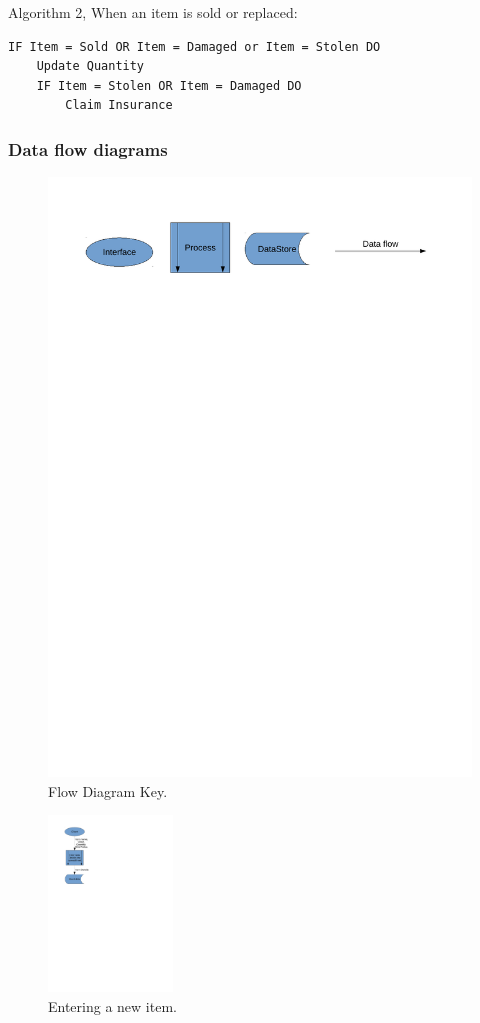 \documentclass[a4paper,12pt]{report}
\begin{document}
Algorithm 2, When an item is sold or replaced:
\begin{lstlisting}
IF Item = Sold OR Item = Damaged or Item = Stolen DO
    Update Quantity
    IF Item = Stolen OR Item = Damaged DO
        Claim Insurance
\end{lstlisting}

\subsubsection{Data flow diagrams}

\begin{figure}[H]
    \caption{Flow Diagram Key.} \label{fig:print_function_result}
    \includegraphics[width=\textwidth]{./Dataflow/DFD_analysis_key.pdf}
\end{figure}

\begin{figure}[H]
    \caption{Entering a new item.} \label{fig:print_function_result}
    \centerline{\includegraphics[width=125px]{./Dataflow/DFD_analysis_new_item.pdf}}
\end{figure}
\end{document}
